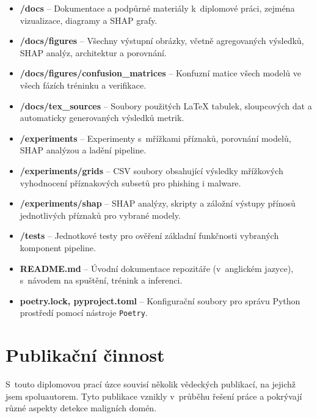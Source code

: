 \begin{itemize}
    \item \textbf{/docs} – Dokumentace a podpůrné materiály k~diplomové práci, zejména vizualizace, diagramy a SHAP grafy.
    
    \item \textbf{/docs/figures} – Všechny výstupní obrázky, včetně agregovaných výsledků, SHAP analýz, architektur a porovnání.
    
    \item \textbf{/docs/figures/confusion\_matrices} – Konfuzní matice všech modelů ve všech fázích tréninku a verifikace.
    
    \item \textbf{/docs/tex\_sources} – Soubory použitých LaTeX tabulek, sloupcových dat a automaticky generovaných výsledků metrik.
    
    \item \textbf{/experiments} – Experimenty s~mřížkami příznaků, porovnání modelů, SHAP analýzou a ladění pipeline.
    
    \item \textbf{/experiments/grids} – CSV soubory obsahující výsledky mřížkových vyhodnocení příznakových subsetů pro phishing i malware.
    
    \item \textbf{/experiments/shap} – SHAP analýzy, skripty a záložní výstupy přínosů jednotlivých příznaků pro vybrané modely.
    
    \item \textbf{/tests} – Jednotkové testy pro ověření základní funkčnosti vybraných komponent pipeline.
    
    \item \textbf{README.md} – Úvodní dokumentace repozitáře (v~anglickém jazyce), s~návodem na spuštění, trénink a inferenci.
    
    \item \textbf{poetry.lock, pyproject.toml} – Konfigurační soubory pro správu Python prostředí pomocí nástroje \texttt{Poetry}.
\end{itemize}
\chapter{Publikační činnost}
\label{appendix:publications}

S~touto diplomovou prací úzce souvisí několik vědeckých publikací, na jejichž jsem spoluautorem. Tyto publikace vznikly v~průběhu řešení práce a pokrývají různé aspekty detekce maligních domén.

